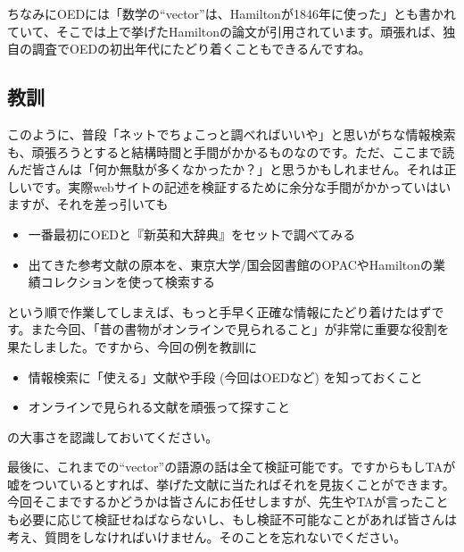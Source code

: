 ちなみにOEDには「数学の``vector''は、Hamiltonが1846年に使った」とも書かれていて、そこでは上で挙げたHamiltonの論文が引用されています。頑張れば、独自の調査でOEDの初出年代にたどり着くこともできるんですね。


\subsection{教訓}

このように、普段「ネットでちょこっと調べればいいや」と思いがちな情報検索も、頑張ろうとすると結構時間と手間がかかるものなのです。ただ、ここまで読んだ皆さんは「何か無駄が多くなかったか？」と思うかもしれません。それは正しいです。実際webサイトの記述を検証するために余分な手間がかかっていはいますが、それを差っ引いても
\begin{itemize}
\item 一番最初にOEDと『新英和大辞典』をセットで調べてみる
\item 出てきた参考文献の原本を、東京大学/国会図書館のOPACやHamiltonの業績コレクションを使って検索する
\end{itemize}
という順で作業してしまえば、もっと手早く正確な情報にたどり着けたはずです。また今回、「昔の書物がオンラインで見られること」が非常に重要な役割を果たしました。ですから、今回の例を教訓に
\begin{itemize}
\item 情報検索に「使える」文献や手段 (今回はOEDなど) を知っておくこと
\item オンラインで見られる文献を頑張って探すこと
\end{itemize}
の大事さを認識しておいてください。

最後に、これまでの``vector''の語源の話は全て検証可能です。ですからもしTAが嘘をついているとすれば、挙げた文献に当たればそれを見抜くことができます。今回そこまでするかどうかは皆さんにお任せしますが、先生やTAが言ったことも必要に応じて検証せねばならないし、もし検証不可能なことがあれば皆さんは考え、質問をしなければいけません。そのことを忘れないでください。

